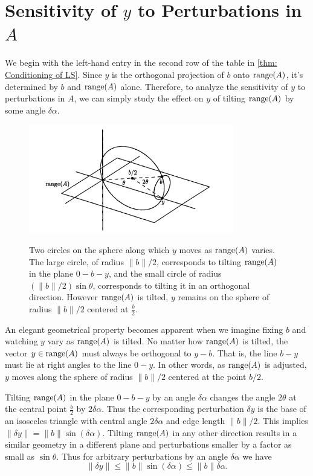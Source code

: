 \section{Sensitivity of $y$ to Perturbations in $A$} 
We begin with the left-hand entry in the second row of the table in \autoref{thm: Conditioning of LS}. Since $y$ is the orthogonal projection of $b$ onto $\operatorname{range}(A)$, it's determined by $b$ and $\operatorname{range}(A)$ alone. Therefore, to analyze the sensitivity of $y$ to perturbations in $A$, we can simply study the effect on $y$ of tilting $\operatorname{range}(A)$ by some angle $\delta \alpha $.  

\begin{figure}[H]
    \centering
    \includegraphics[width=0.8\textwidth]{figures/18-2.png}
    \label{fig: 18.2}
    \caption{Two circles on the sphere along which $y$ moves as $\operatorname{range}(A)$ varies. The large circle, of radius $\|b\|/2$, corresponds to tilting $\operatorname{range}(A)$ in the plane $0-b-y$, and the small circle of radius $(\|b\|/2)\sin \theta $, corresponds to tilting it in an orthogonal direction. However $\operatorname{range}(A)$ is tilted, $y$ remains on the sphere of radius $\|b\|/2$ centered at $\frac{b}{2}$.}
\end{figure}

An elegant geometrical property becomes apparent when we imagine fixing $b$ and watching $y$ vary as $\operatorname{range}(A)$ is tilted. No matter how $\operatorname{range}(A)$ is tilted, the vector $y\in \operatorname{range}(A)$ must always be orthogonal to $y-b$. That is, the line $b-y$ must lie at right angles to the line $0-y$. In other words, as $\operatorname{range}(A)$ is adjusted, $y$ moves along the sphere of radius $\|b\|/2$ centered at the point $b /2$. 

Tilting $\operatorname{range}(A)$ in the plane $0-b-y$ by an angle $\delta \alpha $ changes the angle $2\theta $ at the central point $\frac{b}{2}$ by $2\delta \alpha $. Thus the corresponding perturbation $\delta y$ is the base of an isosceles triangle with central angle $2\delta \alpha $ and edge length $\|b\|/2$. This implies $\|\delta y\| = \|b\| \sin (\delta \alpha )$. Tilting $\operatorname{range}(A)$ in any other direction results in a similar geometry in a different plane and perturbations smaller by a factor as small as $\sin \theta $. Thus for arbitrary perturbations by an angle $\delta \alpha $ we have 
\begin{equation}
    \label{eq: y to A} 
    \|\delta  y \|\le \|b\| \sin (\delta \alpha ) \le \|b\| \delta \alpha . 
\end{equation}

